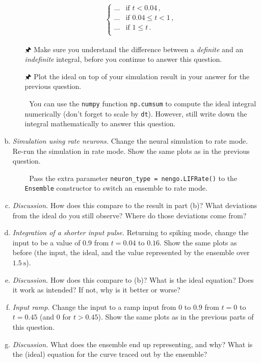 \begin{enumerate}[a)]
\begin{itemize}
\begin{align*}
\begin{cases}
					\ldots & \text{if } t < 0.04 \,,\\
					\ldots & \text{if } 0.04 \leq t < 1 \,,\\
					\ldots & \text{if } 1 \leq t \,.\\
				\end{cases}
			\end{align*}
			\item[{\symbolfont 🖈}] Make sure you understand the difference between a \emph{definite} and an \emph{indefinite} integral, before you continue to answer this question.
			\item[{\symbolfont 🖈}] Plot the ideal on top of your simulation result in your answer for the previous question.
			\item[{\symbolfont 🐍}] You can use the \texttt{numpy} function \texttt{np.cumsum} to compute the ideal integral numerically (don't forget to scale by \texttt{dt}). However, still write down the integral mathematically to answer this question.
		\end{itemize}
		\item {} \emph{Simulation using rate neurons.} Change the neural simulation to rate mode. Re-run the simulation in rate mode. Show the same plots as in the previous question.
		\begin{itemize}
			\item[{\symbolfont 🐍}] Pass the extra parameter \texttt{neuron\_type = nengo.LIFRate()} to the \texttt{Ensemble} constructor to switch an ensemble to rate mode.
		\end{itemize}
		\item {} \emph{Discussion.}  How does this compare to the result in part (b)? What deviations from the ideal do you still observe? Where do those deviations come from?
		\item {} \emph{Integration of a shorter input pulse.} Returning to spiking mode, change the input to be a value of $0.9$ from $t=0.04$ to $0.16$. Show the same plots as before (the input, the ideal, and the value represented by the ensemble over $\SI{1.5}{\second}$). 
		\item {} \emph{Discussion.} How does this compare to (b)? What is the ideal equation? Does it work as intended? If not, why is it better or worse?
		\item {} \emph{Input ramp.} Change the input to a ramp input from $0$ to $0.9$ from $t=0$ to $t=0.45$ (and $0$ for $t>0.45$). Show the same plots as in the previous parts of this question.
		\item {} \emph{Discussion.} What does the ensemble end up representing, and why? What is the (ideal) equation for the curve traced out by the ensemble? 

\end{enumerate}

